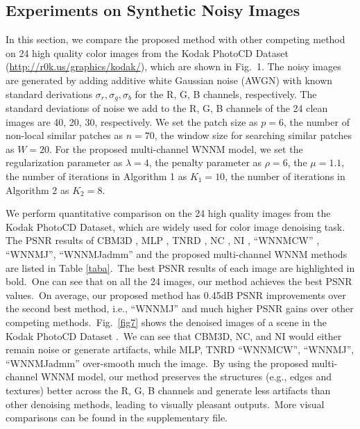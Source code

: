 \documentclass[10pt,twocolumn,letterpaper,sort&compress]{article}
\begin{document}
\subsection{Experiments on Synthetic Noisy Images}
In this section, we compare the proposed method with other competing method \cite{cbm3d,mlp,wnnm,csf,chen2015learning,noiseclinic,neatimage}
on 24 high quality color images from the Kodak PhotoCD Dataset (\url{http://r0k.us/graphics/kodak/}), which are shown in Fig.\ 1. The noisy images are generated by adding additive white Gaussian noise (AWGN) with known standard derivations $\sigma_{r}, \sigma_{g}, \sigma_{b}$ for the R, G, B channels, respectively. The standard deviations of noise we add to the R, G, B channels of the 24 clean images are 40, 20, 30, respectively.  We set the patch size as $p = 6$, the number of non-local similar patches as $n = 70$, the window size for searching similar patches as $W = 20$. For the proposed multi-channel WNNM model, we set the regularization parameter as $\lambda=4$, the penalty parameter as $\rho=6$, the $\mu=1.1$, the number of iterations in Algorithm 1 as $K_{1} = 10$, the number of iterations in Algorithm 2 as $K_{2}=8$. 

We perform quantitative comparison on the 24 high quality images from the Kodak PhotoCD Dataset, which are widely used for color image denoising task. The PSNR results of CBM3D \cite{bm3d}, MLP \cite{mlp}, TNRD \cite{chen2015learning}, NC \cite{noiseclinic,ncwebsite}, NI \cite{neatimage}, ``WNNMCW'' \cite{wnnmijcv}, ``WNNMJ'', ``WNNMJadmm'' and the proposed multi-channel WNNM methods are listed in Table \ref{taba}.\ The best PSNR results of each image are highlighted in bold.\ One can see that on all the 24 images, our method achieves the best PSNR values.\ On average, our proposed method has 0.45dB PSNR improvements over the second best method, i.e., ``WNNMJ'' and much higher PSNR gains over other competing methods.\ Fig.\ \ref{fig7} shows the denoised images of a scene in the Kodak PhotoCD Dataset .\ We can see that CBM3D, NC, and NI would either remain noise or generate artifacts, while MLP, TNRD ``WNNMCW'', ``WNNMJ'', ``WNNMJadmm'' over-smooth much the image.\ By using the proposed multi-channel WNNM model, our method preserves the structures (e.g., edges and textures) better across the R, G, B channels and generate less artifacts than other denoising methods, leading to visually pleasant outputs.\ More visual comparisons can be found in the supplementary file.
\end{document}
